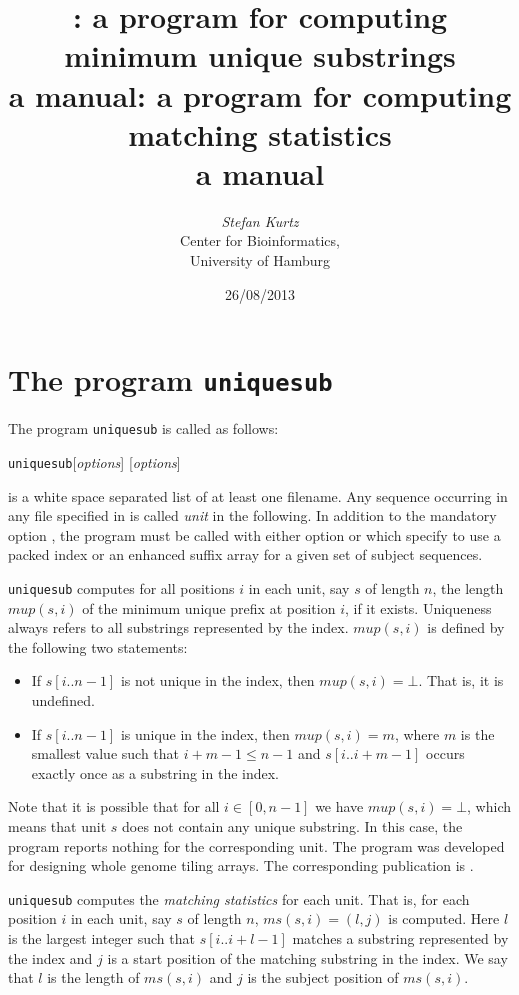 \documentclass[12pt]{article}
\title{\Program: a program for computing\\
       minimum unique substrings\\
       a manual}
\title{\Program: a program for computing\\
       matching statistics\\
       a manual}
\author{\begin{tabular}{c}
         \textit{Stefan Kurtz}\\
         Center for Bioinformatics,\\
         University of Hamburg
        \end{tabular}}
\date{26/08/2013}
\newcommand{\Substring}[3]{#1[#2..#3]}
\newcommand{\Program}[0]{\texttt{uniquesub}\xspace}
\newcommand{\Mup}[1]{\mathit{mup(s,#1)}}
\newcommand{\Program}[0]{\texttt{matstat}\xspace}
\newcommand{\MS}[1]{\mathit{ms(s,#1)}}
\begin{document}
\maketitle

\section{The program \Program}

The program \Program is called as follows:
\par
\noindent\Program [\textit{options}]   [\textit{options}] 
\par
{} is a white space separated list of at least one 
filename. Any sequence occurring in any file specified in 
is called \textit{unit} in the following.
In addition to the mandatory option , the program
must be called with either option  or 
which specify to use a packed index or an enhanced suffix array for 
a given set of subject sequences.

\begin{AboutUniquesub}
\Program computes for all positions \(i\) in each unit, say \(s\) of length
\(n\), the length \(\Mup{i}\) of the minimum unique prefix 
at position \(i\), if it exists. Uniqueness always refers to all substrings
represented by the index. \(\Mup{i}\) is defined by the following two 
statements:
\begin{itemize}
\item
If \(\Substring{s}{i}{n-1}\) is not unique in the index, then \(\Mup{i}=\bot\).
That is, it is undefined.
\item
If \(\Substring{s}{i}{n-1}\) is unique in the index, then \(\Mup{i}=m\), where 
\(m\) is the smallest value such that \(i+m-1\leq n-1\) and 
\(\Substring{s}{i}{i+m-1}\) occurs exactly once as a substring in the index.
\end{itemize}
Note that it is possible that for all \(i\in[0,n-1]\) we have 
\(\Mup{i}=\bot\), which means that unit \(s\) does not contain any unique 
substring. In this case, the program reports nothing for the corresponding
unit. The program was developed for designing whole genome tiling arrays.
The corresponding publication is \cite{GRAE:NIE:KUR:HUY:BIR:STU:FLI:2007}.
\end{AboutUniquesub}

\begin{AboutMatstat}
\Program computes the  \textit{matching statistics} for each unit. That is, 
for each position \(i\) in 
each unit, say \(s\) of length \(n\), \(\MS{i}=(l,j)\) is computed. Here
\(l\) is the largest integer such that \(\Substring{s}{i}{i+l-1}\) matches
a substring represented by the index and \(j\) is a start position of the
matching substring in the index. We say that \(l\) is the length of \(\MS{i}\)
and \(j\) is the subject position of \(\MS{i}\).
\end{AboutMatstat}
\end{document}
